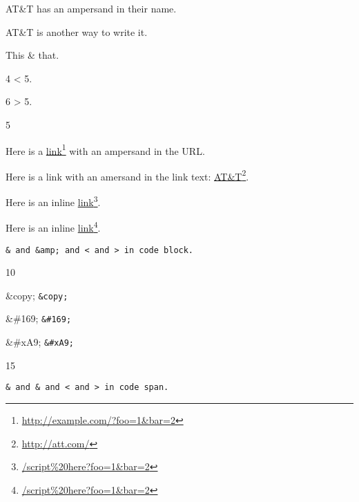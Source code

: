 
\def\mytitle{Amps and Angles}


AT\&T has an ampersand in their name.

AT\&T is another way to write it.

This \& that.

4 < 5.

6 > 5.

5

Here is a \href{http://example.com/?foo=1&bar=2}{link}\footnote{\href{http://example.com/?foo=1&bar=2}{http:\slash{}\slash{}example.com\slash{}?foo=1\&bar=2}} with an ampersand in the URL.

Here is a link with an amersand in the link text: \href{http://att.com/}{AT\&T}\footnote{\href{http://att.com/}{http:\slash{}\slash{}att.com\slash{}}}.

Here is an inline \href{/script%20here?foo=1&bar=2}{link}\footnote{\href{/script%20here?foo=1&bar=2}{\slash{}script\%20here?foo=1\&bar=2}}.

Here is an inline \href{/script%20here?foo=1&bar=2}{link}\footnote{\href{/script%20here?foo=1&bar=2}{\slash{}script\%20here?foo=1\&bar=2}}.

\begin{verbatim}
& and &amp; and < and > in code block.
\end{verbatim}

10

\&copy; \texttt{\&copy;}

\&\#169; \texttt{\&\#169;}

\&\#xA9; \texttt{\&\#xA9;}

15

\texttt{\& and \& and < and > in code span.}



